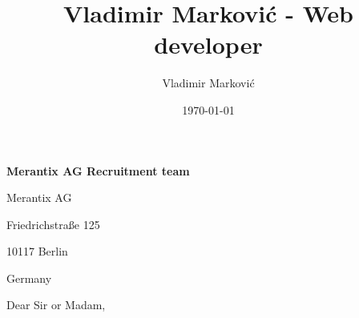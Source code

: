 \documentclass{article}
\title{Vladimir Marković - Web developer}
\author{Vladimir Marković}
\date{\today}
\begin{document}
\sffamily

\vspace{0mm}
\setlength{\parindent}{1mm}
\large
\textbf{Merantix AG Recruitment team}

\vspace{0mm}
\setlength{\parindent}{1mm}
Merantix AG

\vspace{0mm}
\setlength{\parindent}{1mm}
Friedrichstraße 125

\vspace{0mm}
\setlength{\parindent}{1mm}
10117 Berlin

\vspace{0mm}
\setlength{\parindent}{1mm}
Germany

\vspace{5mm}
\setlength{\parindent}{1mm}
\usdate{\today}

\vspace{5mm}
\setlength{\parindent}{1mm}
Dear Sir or Madam,

\vspace{5mm}
\end{document}
